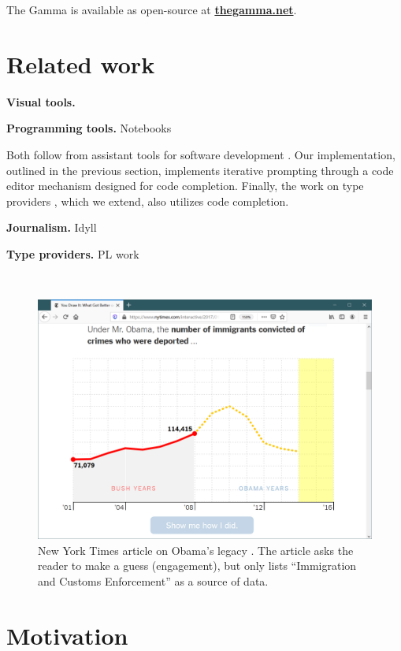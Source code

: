 \documentclass{sigchi}
\begin{document}
The Gamma is available as open-source at \href{http://thegamma.net}{\small\bf\ttfamily thegamma.net}.

\section{Related work}

\textbf{Visual tools.}

\textbf{Programming tools.}
Notebooks

Both follow from assistant tools for software development \cite{assistants}. Our implementation,
outlined in the previous section, implements iterative prompting through a code editor mechanism
designed for code completion. Finally, the work on type providers \cite{inforich,fsdata,dotdriven},
which we extend, also utilizes code completion.


\textbf{Journalism.}
Idyll \cite{idyll}

\textbf{Type providers.}
PL work

\newpage
~
\newpage

\begin{figure}
\includegraphics[width=1\columnwidth]{figures/nyt}
\caption{New York Times article on Obama's legacy \cite{youdraw}. The article asks the reader to make a guess
(engagement), but only lists ``Immigration and Customs Enforcement'' as a source of data.}
\label{fig:nyt}
\end{figure}

\section{Motivation}
\label{sec:motivation}
\end{document}
